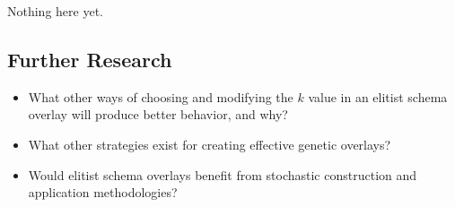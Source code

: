 Nothing here yet.

\subsection*{Further Research}

\begin{itemize}
\item What other ways of choosing and modifying the $k$ value in an elitist schema overlay will produce better behavior, and why?

\item What other strategies exist for creating effective genetic overlays?

\item Would elitist schema overlays benefit from stochastic construction and application methodologies?
\end{itemize}